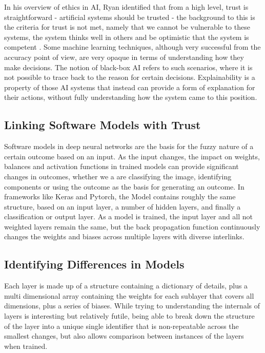 In his overview of ethics in AI, Ryan \cite{ryan_ai_2020} identified that from a high level, trust is straightforward - artificial systems should be trusted - the background to this is the criteria for trust is not met, namely that we cannot be vulnerable to these systems, the system thinks well in others and be optimistic that the system is competent 
\cite{mcleod_trust_2020}. Some machine learning techniques, although very successful from the accuracy point of view, are very opaque in terms of understanding how they make decisions. The notion of black-box AI refers to such scenarios, where it is not possible to trace back to the reason for certain decisions. Explainability is a property of those AI systems that instead can provide a form of explanation for their actions, without fully understanding how the system came to this position.

\subsection{Linking Software Models with Trust}
Software models in deep neural networks are the basis for the fuzzy nature of a certain outcome based on an input. As the input changes, the impact on weights, balances and activation functions in trained models can provide significant changes in outcomes, whether we a are classifying the image, identifying components or using the outcome as the basis for generating an outcome\cite{miikkulainen_chapter_2019}. In frameworks like Keras and Pytorch, the Model contains roughly the same structure, based on an input layer, a number of hidden layers, and finally a classification or output layer. As a model is trained, the input layer and all not weighted layers remain the same, but the back propagation function continuously changes the weights and biases across multiple layers with diverse interlinks\cite{hecht-nielsen_iii3_1992}.

\subsection{Identifying Differences in Models}
Each layer is made up of a structure containing a dictionary of details, plus a multi dimensional array containing the weights for each sublayer that covers all  dimensions, plus a series of biases. While trying to understanding the internals of layers is interesting but relatively futile, being able to break down the structure of the layer into a unique single identifier that is non-repeatable across the smallest changes, but also allows comparison between instances of the layers when trained.

